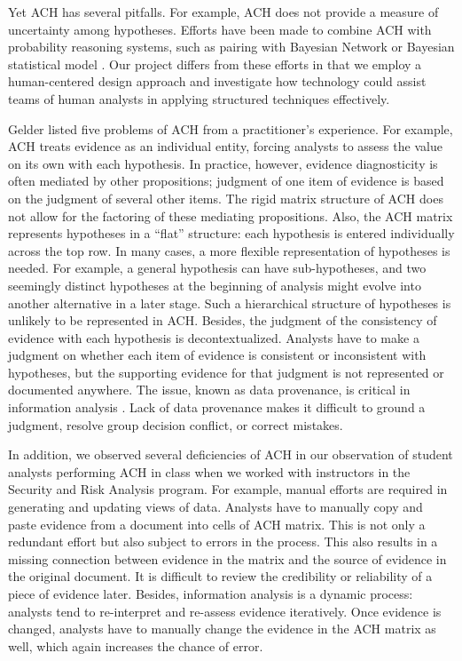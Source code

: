 Yet ACH has several pitfalls. For example, ACH does not provide a measure of uncertainty among hypotheses. Efforts have been made to combine ACH with probability reasoning systems, such as pairing with Bayesian Network \citep{Karvetski2013} or Bayesian statistical model \citep{Duncan2008}. Our project differs from these efforts in that we employ a human-centered design approach and investigate how technology could assist teams of human analysts in applying structured techniques effectively.

Gelder \cite{Gelder2008} listed five problems of ACH from a practitioner’s experience. For example, ACH treats evidence as an individual entity, forcing analysts to assess the value on its own with each hypothesis. In practice, however, evidence diagnosticity is often mediated by other propositions; judgment of one item of evidence is based on the judgment of several other items. The rigid matrix structure of ACH does not allow for the factoring of these mediating propositions. Also, the ACH matrix represents hypotheses in a “flat” structure: each hypothesis is entered individually across the top row. In many cases, a more flexible representation of hypotheses is needed. For example, a general hypothesis can have sub-hypotheses, and two seemingly distinct hypotheses at the beginning of analysis might evolve into another alternative in a later stage. Such a hierarchical structure of hypotheses is unlikely to be represented in ACH. Besides, the judgment of the consistency of evidence with each hypothesis is decontextualized. Analysts have to make a judgment on whether each item of evidence is consistent or inconsistent with hypotheses, but the supporting evidence for that judgment is not represented or documented anywhere. The issue, known as data provenance, is critical in information analysis \citep{Chin2009}. Lack of data provenance makes it difficult to ground a judgment, resolve group decision conflict, or correct mistakes. 

In addition, we observed several deficiencies of ACH in our observation of student analysts performing ACH in class when we worked with instructors in the Security and Risk Analysis program. For example, manual efforts are required in generating and updating views of data. Analysts have to manually copy and paste evidence from a document into cells of ACH matrix. This is not only a redundant effort but also subject to errors in the process. This also results in a missing connection between evidence in the matrix and the source of evidence in the original document. It is difficult to review the credibility or reliability of a piece of evidence later. Besides, information analysis is a dynamic process: analysts tend to re-interpret and re-assess evidence iteratively. Once evidence is changed, analysts have to manually change the evidence in the ACH matrix as well, which again increases the chance of error.

